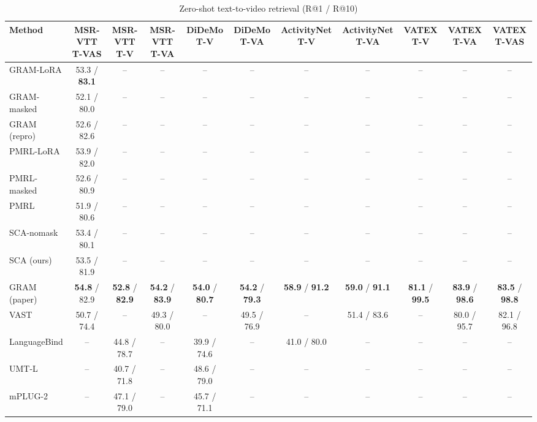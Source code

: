 \begin{table}[t]
\centering
\caption{Zero-shot text-to-video retrieval (R@1 / R@10)}
\label{tab:zeroshot_t2v}
\small
\begin{tabular}{lcccccccccc}
\toprule
Method & MSR-VTT T-VAS & MSR-VTT T-V & MSR-VTT T-VA & DiDeMo T-V & DiDeMo T-VA & ActivityNet T-V & ActivityNet T-VA & VATEX T-V & VATEX T-VA & VATEX T-VAS \\
\midrule
GRAM-LoRA & 53.3 / \textbf{83.1} & -- & -- & -- & -- & -- & -- & -- & -- & -- \\
GRAM-masked & 52.1 / 80.0 & -- & -- & -- & -- & -- & -- & -- & -- & -- \\
GRAM (repro) & 52.6 / 82.6 & -- & -- & -- & -- & -- & -- & -- & -- & -- \\
PMRL-LoRA & 53.9 / 82.0 & -- & -- & -- & -- & -- & -- & -- & -- & -- \\
PMRL-masked & 52.6 / 80.9 & -- & -- & -- & -- & -- & -- & -- & -- & -- \\
PMRL & 51.9 / 80.6 & -- & -- & -- & -- & -- & -- & -- & -- & -- \\
SCA-nomask & 53.4 / 80.1 & -- & -- & -- & -- & -- & -- & -- & -- & -- \\
SCA (ours) & 53.5 / 81.9 & -- & -- & -- & -- & -- & -- & -- & -- & -- \\
GRAM (paper) & \textbf{54.8} / 82.9 & \textbf{52.8} / \textbf{82.9} & \textbf{54.2} / \textbf{83.9} & \textbf{54.0} / \textbf{80.7} & \textbf{54.2} / \textbf{79.3} & \textbf{58.9} / \textbf{91.2} & \textbf{59.0} / \textbf{91.1} & \textbf{81.1} / \textbf{99.5} & \textbf{83.9} / \textbf{98.6} & \textbf{83.5} / \textbf{98.8} \\
VAST & 50.7 / 74.4 & -- & 49.3 / 80.0 & -- & 49.5 / 76.9 & -- & 51.4 / 83.6 & -- & 80.0 / 95.7 & 82.1 / 96.8 \\
LanguageBind & -- & 44.8 / 78.7 & -- & 39.9 / 74.6 & -- & 41.0 / 80.0 & -- & -- & -- & -- \\
UMT-L & -- & 40.7 / 71.8 & -- & 48.6 / 79.0 & -- & -- & -- & -- & -- & -- \\
mPLUG-2 & -- & 47.1 / 79.0 & -- & 45.7 / 71.1 & -- & -- & -- & -- & -- & -- \\
\bottomrule
\end{tabular}
\end{table}
